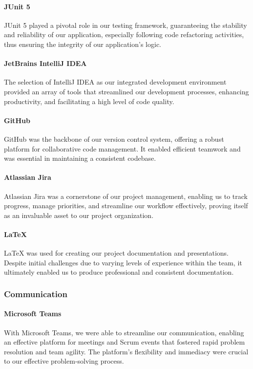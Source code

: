 \paragraph{JUnit 5}
JUnit 5 played a pivotal role in our testing framework, guaranteeing the stability and reliability of our application, especially following code refactoring activities, thus ensuring the integrity of our application's logic.

\paragraph{JetBrains IntelliJ IDEA}
The selection of IntelliJ IDEA as our integrated development environment provided an array of tools that streamlined our development processes, enhancing productivity, and facilitating a high level of code quality.

\paragraph{GitHub}
GitHub was the backbone of our version control system, offering a robust platform for collaborative code management.
It enabled efficient teamwork and was essential in maintaining a consistent codebase.

\paragraph{Atlassian Jira}
Atlassian Jira was a cornerstone of our project management, enabling us to track progress, manage priorities, and streamline our workflow effectively, proving itself as an invaluable asset to our project organization.

\paragraph{LaTeX}
LaTeX was used for creating our project documentation and presentations.
Despite initial challenges due to varying levels of experience within the team, it ultimately enabled us to produce professional and consistent documentation.

\subsubsection{Communication}

\paragraph{Microsoft Teams}
With Microsoft Teams, we were able to streamline our communication, enabling an effective platform for meetings and Scrum events that fostered rapid problem resolution and team agility.
The platform's flexibility and immediacy were crucial to our effective problem-solving process.

